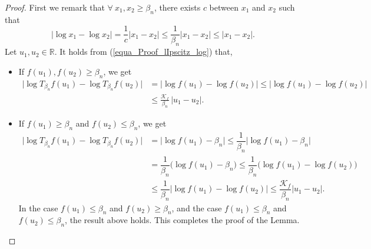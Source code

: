 \documentclass[10pt,a4paper]{amsart}
\newcommand{\R}{\ensuremath{\mathbb{R}}}
\begin{document}
\begin{proof}
%
%
 First we remark that $\forall~ x_1, x_2 \ge \beta_n$, there exists $c$ between $x_1$ and $x_2$ such that
%
\begin{equation}\label{equa_Proof_lIpscitz_log}
    |\log x_1 - \log x_2| = \dfrac{1}{c}|x_1 - x_2| \leq \dfrac{1}{\beta_n}|x_1 - x_2| \leq |x_1 - x_2|.
\end{equation}
%
Let $u_1, u_2 \in \R$.
It holds from (\ref{equa_Proof_lIpscitz_log}) that,
%
\begin{itemize}
    \item[$\bullet$] If $f(u_1), f(u_2) \ge \beta_n$, we get
    \begin{align*}
         \big|\log T_{\beta_n} f(u_1) - \log T_{\beta_n} f(u_2)\big|  & = \big|\log f(u_1) - \log f(u_2)\big|   \leq \big|\log f(u_1) - \log f(u_2)\big|
    \\
    & \leq \frac{\mathcal{K}_f}{\beta_n}\, |u_1 - u_2|.
    \end{align*}
    \item[$\bullet$] If $f(u_1) \ge \beta_n$ and $f(u_2) \leq \beta_n$, we get
    \begin{align*}
         \big|\log T_{\beta_n} f(u_1) - \log T_{\beta_n} f(u_2)\big|  & = \big|\log f(u_1) - \beta_n\big|   \leq \dfrac{1}{\beta_n}\big|\log f(u_1) - \beta_n\big|
    \\
    & = \dfrac{1}{\beta_n}\big(\log f(u_1) - \beta_n\big) \leq \dfrac{1}{\beta_n}\big(\log f(u_1) - \log f(u_2)\big)
     \\
    &\leq \dfrac{1}{\beta_n}\big|\log f(u_1) - \log f(u_2)\big| \leq \dfrac{\mathcal{K}_f}{\beta_n}\big|u_1 - u_2\big|.
    \end{align*}
    In the case $f(u_1) \leq \beta_n$ and $f(u_2) \ge \beta_n$, and the case $f(u_1) \leq \beta_n$ and $f(u_2) \leq \beta_n$, the result above holds. This completes the proof of the Lemma. 
\end{itemize}

\end{proof}
\end{document}
